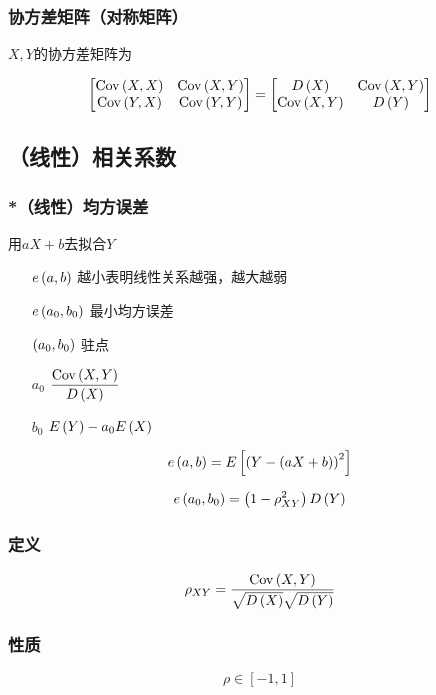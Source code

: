 \documentclass{article}
\begin{document}
\subsubsection{协方差矩阵（对称矩阵）}

$X,Y$的协方差矩阵为

\[\begin{bmatrix}
        \mathrm{Cov}\left(X,X\right) & \mathrm{Cov}\left(X,Y\right) \\
        \mathrm{Cov}\left(Y,X\right) & \mathrm{Cov}\left(Y,Y\right)
    \end{bmatrix}=
    \begin{bmatrix}
        D\left(X\right)  & \mathrm{Cov}\left(X,Y\right) \\
        \mathrm{Cov}\left(X,Y\right) & D\left(Y\right)
    \end{bmatrix}\]

\subsection{（线性）相关系数}

\subsubsection{*（线性）均方误差}

用$aX+b$去拟合$Y$

\begin{enumerate}
    \item [$e\left(a,b\right)$] 越小表明线性关系越强，越大越弱
    \item [$e\left(a_0,b_0\right)$] 最小均方误差
    \item [$\left(a_0,b_0\right)$] 驻点
    \item [$a_0$] $\dfrac{\mathrm{Cov}\left(X,Y\right)}{D\left(X\right)}$
    \item [$b_0$] $E\left(Y\right)-a_0E\left(X\right)$
\end{enumerate}

\[e\left(a,b\right)=E\left[{\left(Y-\left(aX+b\right)\right)}^2\right]\]

\[e\left(a_0,b_0\right)=\left(1-\rho^2_{XY}\right)D\left(Y\right)\]

\subsubsection{定义}

\[\rho_{XY}=\frac{\mathrm{Cov}\left(X,Y\right)}{\sqrt{D\left(X\right)}\sqrt{D\left(Y\right)}}\]

\subsubsection{性质}

\[\rho\in\left[-1,1\right]\]
\end{document}
